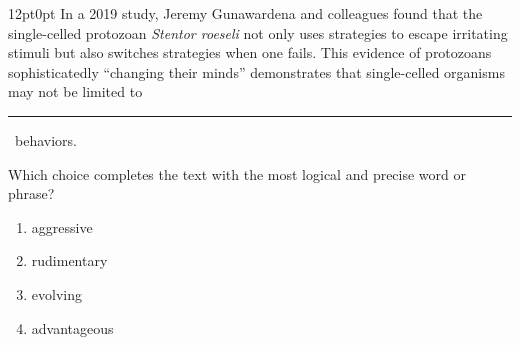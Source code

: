 \documentclass[11pt, twocolumn]{article}
\newcounter{questionnum}
\begin{document}
\vspace{6pt}\noindent
\begin{minipage}{\columnwidth}\raggedright
\noindent{}\par\vspace{8pt}
\begin{adjustwidth}{12pt}{0pt}
In a 2019 study, Jeremy Gunawardena and colleagues found that the single-celled protozoan \textit{Stentor roeseli} not only uses strategies to escape irritating stimuli but also switches strategies when one fails. This evidence of protozoans sophisticatedly ``changing their minds'' demonstrates that single-celled organisms may not be limited to \,\rule{2cm}{0.4pt}\, behaviors.
\vspace{6pt}

Which choice completes the text with the most logical and precise word or phrase?
\begin{enumerate}[label=\Alph*),leftmargin=18pt,topsep=3pt,itemsep=2pt]
  \item aggressive
  \item rudimentary
  \item evolving
  \item advantageous
\end{enumerate}
\end{adjustwidth}
\end{minipage}\par
\end{document}
